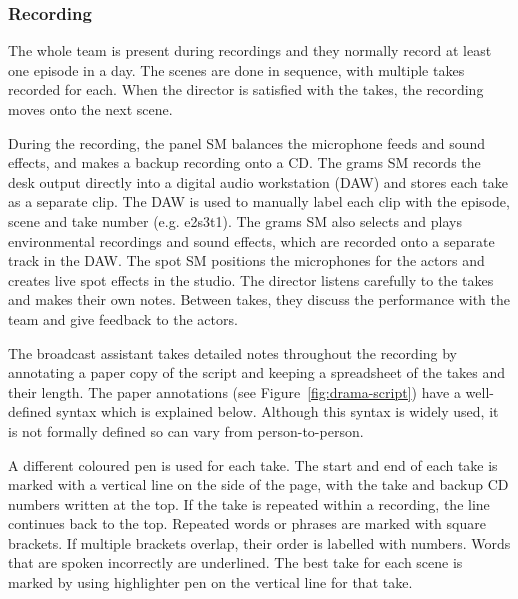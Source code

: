 \subsubsection{Recording}
The whole team is present during recordings and they normally record at least
one episode in a day. The scenes are done in sequence, with multiple takes
recorded for each. When the director is satisfied with the takes, the recording
moves onto the next scene.

During the recording, the panel SM balances the microphone feeds and sound
effects, and makes a backup recording onto a CD. The grams SM records the desk
output directly into a digital audio workstation (DAW) and stores each take as
a separate clip. The DAW is used to manually label each clip with the episode,
scene and take number (e.g. e2s3t1). The grams SM also selects and plays
environmental recordings and sound effects, which are recorded onto a separate
track in the DAW. The spot SM positions the microphones for the actors and
creates live spot effects in the studio. The director listens carefully to the
takes and makes their own notes.  Between takes, they discuss the performance
with the team and give feedback to the actors.

The broadcast assistant takes detailed notes throughout the recording by
annotating a paper copy of the script and keeping a spreadsheet of the takes
and their length. The paper annotations (see Figure~\ref{fig:drama-script})
have a well-defined syntax which is explained below. Although this syntax is
widely used, it is not formally defined so can vary from person-to-person.

A different coloured pen is used for each take. The start and end of each take
is marked with a vertical line on the side of the page, with the take and
backup CD numbers written at the top. If the take is repeated within a 
recording, the line continues back to the top. Repeated words or phrases are
marked with square brackets. If multiple brackets overlap, their order is
labelled with numbers.  Words that are spoken incorrectly are underlined. The
best take for each scene is marked by using highlighter pen on the vertical
line for that take.

